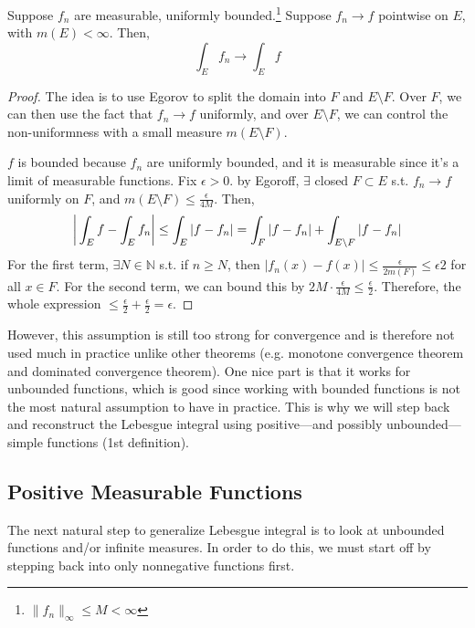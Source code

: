   \begin{theorem}
    Suppose $f_n$ are measurable, uniformly bounded.\footnote{$\|f_n\|_\infty \leq M < \infty$} Suppose $f_n \to f$ pointwise on $E$, with $m(E) < \infty$. Then, 
    \begin{equation}
      \int_E f_n \to \int_E f
    \end{equation}
  \end{theorem}
  \begin{proof}
    The idea is to use Egorov to split the domain into $F$ and $E \setminus F$. Over $F$, we can then use the fact that $f_n \to f$ uniformly, and over $E \setminus F$, we can control the non-uniformness with a small measure $m(E \setminus F)$. 

    $f$ is bounded because $f_n$ are uniformly bounded, and it is measurable since it's a limit of measurable functions. Fix $\epsilon > 0$. by Egoroff, $\exists$ closed $F \subset E$ s.t. $f_n \to f$ uniformly on $F$, and $m(E \setminus F) \leq \frac{\epsilon}{4M}$. Then, 
    \begin{equation}
      \bigg| \int_E f - \int_E f_n \bigg| \leq \int_E |f - f_n| = \int_F |f - f_n| + \int_{E \setminus F} |f - f_n|  \\ 
    \end{equation}
    For the first term, $\exists N \in \mathbb{N}$ s.t. if $n \geq N$, then $|f_n (x) - f(x)| \leq \frac{\epsilon}{2 m(F)} \leq \epsilon{2}$ for all $x \in F$. For the second term, we can bound this by $2M \cdot \frac{\epsilon}{4M} \leq \frac{\epsilon}{2}$. Therefore, the whole expression $\leq \frac{\epsilon}{2} + \frac{\epsilon}{2} = \epsilon$. 
  \end{proof}

  However, this assumption is still too strong for convergence and is therefore not used much in practice unlike other theorems (e.g. monotone convergence theorem and dominated convergence theorem). One nice part is that it works for unbounded functions, which is good since working with bounded functions is not the most natural assumption to have in practice. This is why we will step back and reconstruct the Lebesgue integral using positive---and possibly unbounded---simple functions (1st definition). 

\subsection{Positive Measurable Functions} 

  The next natural step to generalize Lebesgue integral is to look at unbounded functions and/or infinite measures. In order to do this, we must start off by stepping back into only nonnegative functions first.

